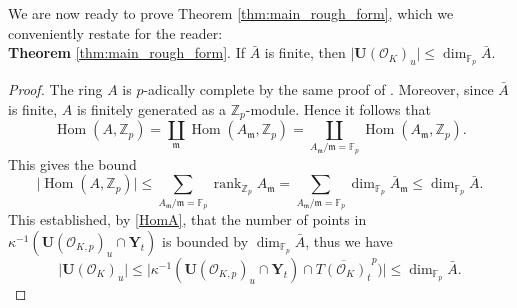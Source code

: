 \documentclass[11pt,oneside]{amsart}
\theoremstyle{plain}
\theoremstyle{definition}
\DeclareMathOperator{\Bl}{Bl}
\DeclareMathOperator{\Hom}{Hom}
\DeclareMathOperator{\rank}{rank} \DeclareMathOperator{\rig}{rig}
\def\fp{\mathfrak{p}}
\def\Z{\mathbb{Z}}
\def\F{\mathbb{F}}
\def\U{\mathbf{U}}
\def\Y{\mathbf{Y}}
\def\oh{\mathcal{O}}
\begin{document}

We are now ready to prove Theorem \ref{thm:main_rough_form}, which we conveniently restate for the reader:\\

\noindent \textbf{Theorem} \ref{thm:main_rough_form}. 
If $\bar{A}$ is finite, then $\vert \U(\oh_K)_u\vert\leq \dim_{\F_p} \bar{A}$.
 

\begin{proof}
The ring $A$ is $p$-adically complete by the same proof of \cite[Theorem 4.12]{EL19}. Moreover, since $\bar{A}$ is finite, $A$ is finitely generated as a $\Z_p$-module. %
Hence it follows that 
\[
\Hom(A, \Z_p)=\coprod_{\mathfrak{m}} \Hom(A_\mathfrak{m}, \Z_p)=\coprod_{A_\mathfrak{m}/\mathfrak{m}=\F_p} \Hom(A_\mathfrak{m}, \Z_p).
\]
This gives the bound 
\[
\vert \Hom(A, \Z_p)\vert \leq \sum_{A_\mathfrak{m}/\mathfrak{m}=\F_p} \rank_{\Z_p} A_\mathfrak{m}=\sum_{A_\mathfrak{m}/\mathfrak{m}=\F_p} \dim_{\F_p} \bar{A}_\mathfrak{m}\leq \dim_{\F_p} \bar{A}.
\]
This established, by \eqref{HomA}, that the number of points in $\kappa^{-1} (\U(\oh_{K, p})_u \cap \Y_t )$ is bounded by $\dim_{\F_p} \bar{A}$, thus we have 
\[
\vert \U(\oh_K)_u \vert\leq \vert \kappa^{-1} (\U(\oh_{K, p})_u \cap \Y_t )\cap \overline{T(\oh_K)_t}^p)\vert \leq \dim_{\F_p} \bar{A}.
\]
\end{proof}
\end{document}
